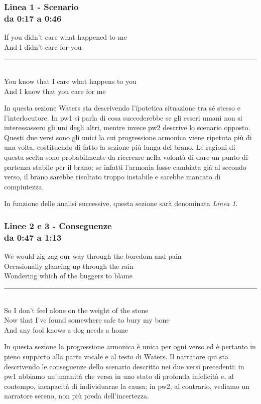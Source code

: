 \documentclass[class=book, crop=false, oneside, 12pt]{standalone}
\begin{document}
    \subsubsection*{Linea 1 - Scenario\\ \small{da 0:17 a 0:46}}
    \begin{displayquote}
        If you didn't care what happened to me \\
        And I didn't care for you \\ 
        \vspace{0pt}
        \rule{.4\linewidth}{.5pt} \\ %
        You know that I care what happens to you \\
        And I know that you care for me 
    \end{displayquote}
    In questa sezione Waters sta descrivendo l'ípotetica situazione tra sé stesso e l'interlocutore. In \acrshort{pw1} si parla di cosa succederebbe se gli esseri umani non si interessassero gli uni degli altri, mentre invece \acrshort{pw2} descrive lo scenario opposto. Questi due versi sono gli unici la cui progressione armonica viene ripetuta più di una volta, costituendo di fatto la sezione più lunga del brano. Le ragioni di questa scelta sono probabilmente da ricercare nella volontà di dare un punto di partenza stabile per il brano; se infatti l'armonia fosse cambiata già al secondo verso, il brano sarebbe risultato troppo instabile e sarebbe mancato di compiutezza.

    In funzione delle analisi successive, questa sezione sarà denominata \emph{Linea 1}.
    
    \subsubsection*{Linee 2 e 3 - Conseguenze\\ \small{da 0:47 a 1:13}}
    \begin{displayquote}
        We would zig-zag our way through the boredom and pain \\
        Occasionally glancing up through the rain \\
        Wondering which of the buggers to blame \\
        \vspace{0pt}
        \rule{.4\linewidth}{.5pt} \\ %
        So I don’t feel alone on the weight of the stone \\
        Now that I’ve found somewhere safe to bury my bone \\
        And any fool knows a dog needs a home 
    \end{displayquote}
    In questa sezione la progressione armonica è unica per ogni verso ed è pertanto in pieno supporto alla parte vocale e al testo di Waters. Il narratore qui sta descrivendo le conseguenze dello scenario descritto nei due versi precedenti: in \acrshort{pw1} abbiamo un'umanità che versa in uno stato di profonda infelicità e, al contempo, incapacità di individuarne la causa; in \acrshort{pw2}, al contrario, vediamo un narratore sereno, non più preda dell'incertezza.
    
\end{document}
